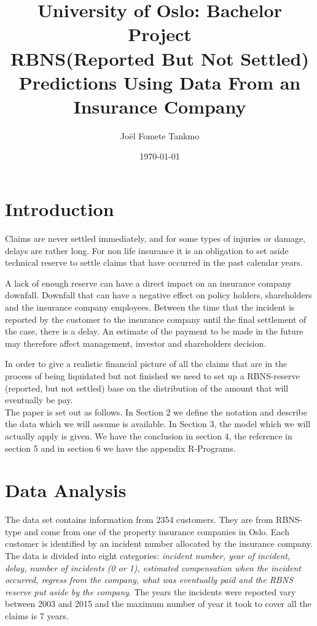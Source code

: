 \documentclass[a4paper]{article}
\title{University of Oslo: Bachelor Project \\ \textbf{RBNS(Reported But Not Settled) Predictions Using Data From an Insurance Company} }
\author{Joël Fomete Tankmo}
\date{\today}
\begin{document}
\maketitle


\newpage


\section{Introduction}

Claims are never settled  immediately, and for some types of injuries or damage, delays are rather long. For non life insurance it is an obligation to set aside technical reserve to settle claims that have occurred in the past calendar years.

A lack of enough reserve can have a direct impact on an insurance company downfall. Downfall that can have a negative effect on policy holders, shareholders and the insurance company employees.     
Between the time that the incident is reported by the customer to the insurance company until the final settlement of the case, there is a delay. An estimate of the payment to be made in the future may therefore affect management, investor and shareholders decision. 

In order to give a realistic financial picture of  all the claims  that are in the process of being liquidated but not finished we need to set up a RBNS-reserve (reported, but not settled) base on the distribution of the amount that will eventually be pay.\\
The paper is set out as follows. In Section 2 we define the notation and describe the data which we will assume is available. In Section 3, the model which we will actually apply is given. We have the conclusion in section 4, the reference in section 5 and in section 6 we have the appendix R-Programs. \\



\section{Data Analysis}


\raggedright The data set contains information from 2354 customers. They are from RBNS-type and come from one of the property insurance companies in Oslo. Each customer is identified by an incident number allocated by the insurance company.   The data is divided into eight categories:   \textit{ incident number, year of incident, delay, number of incidents (0 or 1), estimated compensation when the incident occurred, regress from the company, what was eventually paid and the RBNS reserve put aside by the company}. 
The years the incidents were reported vary between 2003 and 2015 and the maximum number of year it took to cover all the claims is 7 years.
\end{document}
